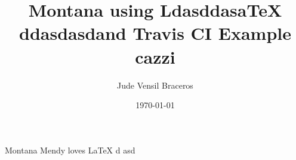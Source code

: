 \documentclass{article}
\title{Montana using LdasddasaTeX ddasdasdand Travis CI Example cazzi}
\author{Jude Vensil Braceros}
\date{\today}
\begin{document}
\maketitle

Montana Mendy loves LaTeX d asd
\end{document}
